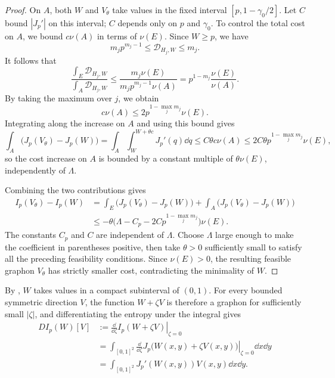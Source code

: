 \begin{proof}
On $A$, both $W$ and $V_\theta$ take values in the fixed interval
$[p,1-\gamma_0/2]$.  Let $C$ bound $|J_p'|$ on this interval;
$C$ depends only on $p$ and $\gamma_0$.
To control the total cost on $A$, we bound $c\nu(A)$ in terms of $\nu(E)$.
Since $W\ge p$, we have
\[
  m_jp^{m_j-1}\le\mathcal D_{H_j,W}\le m_j.
\]
It follows that
\[
  \frac{\int_E\mathcal D_{H_j,W}}{\int_A\mathcal D_{H_j,W}}
  \le\frac{m_j\nu(E)}{m_jp^{m_j-1}\nu(A)}
  =p^{1-m_j}\frac{\nu(E)}{\nu(A)}.
\]
By taking the maximum over $j$, we obtain
\[
  c\nu(A)\le2p^{1-\max_jm_j}\nu(E).
\]
Integrating along the increase on $A$ and using this bound gives
\[
    \int_A\bigl(J_p(V_\theta)-J_p(W)\bigr)
    =\int_A\int_W^{W+\theta c}J_p'(q)\dd q
    \le C\theta c\nu(A)
    \le2C\theta p^{1-\max_jm_j}\nu(E),
\]
so the cost increase on $A$ is bounded by a constant multiple of
$\theta\nu(E)$, independently of $\Lambda$.

Combining the two contributions gives
\begin{align*}
  I_p(V_\theta)-I_p(W)
  &=\int_E\bigl(J_p(V_\theta)-J_p(W)\bigr)
    +\int_A\bigl(J_p(V_\theta)-J_p(W)\bigr)\\
  &\le-\theta\bigl(\Lambda-C_p-2Cp^{1-\max_jm_j}\bigr)\nu(E).
\end{align*}
The constants $C_p$ and $C$ are independent of $\Lambda$.  Choose
$\Lambda$ large enough to make the coefficient in parentheses
positive, then take $\theta>0$ sufficiently small to satisfy all
the preceding feasibility conditions.  Since $\nu(E)>0$, the resulting
feasible graphon $V_\theta$ has strictly smaller cost, contradicting
the minimality of $W$.
\end{proof}

By , $W$ takes values in a compact subinterval
of $(0,1)$.  For every bounded symmetric direction $V$, the function
$W+\zeta V$ is therefore a graphon for sufficiently small $|\zeta|$,
and differentiating the entropy under the integral gives
\begin{align*}
  DI_p(W)[V]
  &:=\left.\frac{\dd}{\dd\zeta}I_p(W+\zeta V)\right|_{\zeta=0} \\
  &=\int_{[0,1]^2}\left.\frac{\dd}{\dd\zeta}J_p\bigl(W(x,y)+\zeta V(x,y)\bigr)\right|_{\zeta=0}\dd x\dd y \\
  &=\int_{[0,1]^2}J_p'(W(x,y))V(x,y)\dd x\dd y.
\end{align*}
